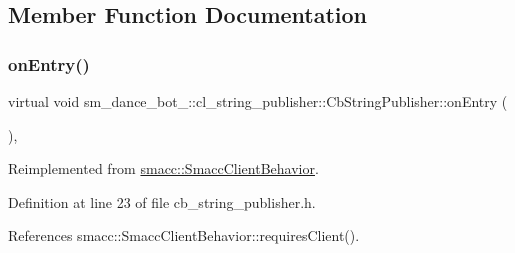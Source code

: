 \subsection{Member Function Documentation}
\mbox{\label{classsm__dance__bot__2_1_1cl__string__publisher_1_1CbStringPublisher_abc3c362ea55110f8d340e5cb4d901892}} 
\subsubsection{\texorpdfstring{on\+Entry()}{onEntry()}}
{\footnotesize\ttfamily virtual void sm\+\_\+dance\+\_\+bot\+\_\+::cl\+\_\+string\+\_\+publisher\+::\+Cb\+String\+Publisher\+::on\+Entry (\begin{DoxyParamCaption}{ }\end{DoxyParamCaption})\hspace{0.3cm}{\ttfamily [inline]}, {\ttfamily [virtual]}}



Reimplemented from \hyperlink{classsmacc_1_1SmaccClientBehavior_a7962382f93987c720ad432fef55b123f}{smacc\+::\+Smacc\+Client\+Behavior}.



Definition at line 23 of file cb\+\_\+string\+\_\+publisher.\+h.



References smacc\+::\+Smacc\+Client\+Behavior\+::requires\+Client().


